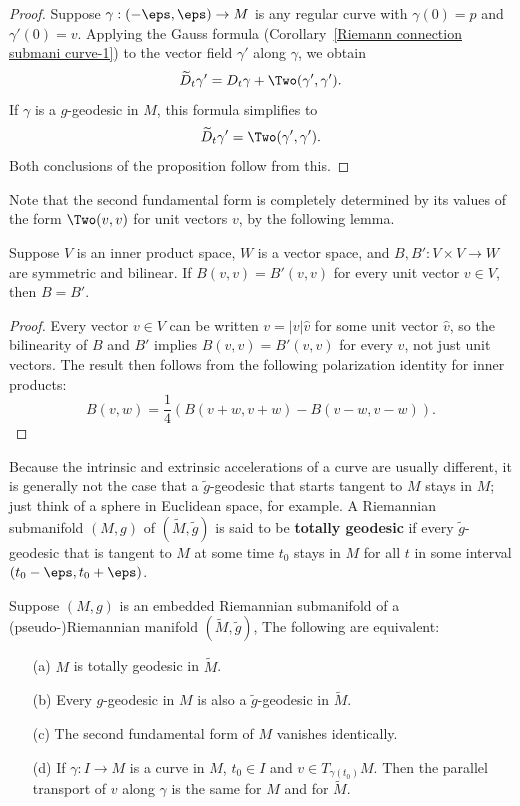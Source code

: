 \begin{proof}
Suppose $\gamma:(-\eps,\eps)\to M$ is any regular curve with $\gamma(0)=p$ and $\gamma'(0)=v$. Applying the Gauss formula (Corollary~\ref{Riemann connection submani curve-1}) 
to the vector field $\gamma'$ along $\gamma$, we obtain
\[\widetilde{D}_t\gamma'=D_t\gamma+\Two(\gamma',\gamma').\]
If $\gamma$ is a $g$-geodesic in $M$, this formula simplifies to
\[\widetilde{D}_t\gamma'=\Two(\gamma',\gamma').\]
Both conclusions of the proposition follow from this.
\end{proof}
Note that the second fundamental form is completely determined by its values of the form $\Two(v,v)$ for unit vectors $v$, by the following lemma.
\begin{lemma}\label{Bilinear symmetric form lemma}
Suppose $V$ is an inner product space, $W$ is a vector space, and $B,B':V\times V\to W$ are symmetric and bilinear. If $B(v,v)=B'(v,v)$ for every unit vector $v\in V$, 
then $B=B'$.
\end{lemma}
\begin{proof}
Every vector $v\in V$ can be written $v=|v|\hat{v}$ for some unit vector $\hat{v}$, so the bilinearity of $B$ and $B'$ implies $B(v,v)=B'(v,v)$ for every $v$, 
not just unit vectors. The result then follows from the following polarization identity for inner products:
\begin{equation*}
B(v,w)=\frac{1}{4}(B(v+w,v+w)-B(v-w,v-w)).\tag*{\qedhere}
\end{equation*}
\end{proof}
Because the intrinsic and extrinsic accelerations of a curve are usually different, it is generally not the case that a $\tilde{g}$-geodesic that starts tangent to 
$M$ stays in $M$; just think of a sphere in Euclidean space, for example. A Riemannian submanifold $(M,g)$ of $(\widetilde{M},\tilde{g})$ is said to be \textbf{totally 
geodesic} if every $\tilde{g}$-geodesic that is tangent to $M$ at some time $t_0$ stays in $M$ for all $t$ in some interval $(t_0-\eps,t_0+\eps)$.
\begin{proposition}
Suppose $(M,g)$ is an embedded Riemannian submanifold of a (pseudo-)Riemannian manifold $(\widetilde{M},\tilde{g})$, The following are equivalent:
\begin{itemize}
\item[(a)] $M$ is totally geodesic in $\widetilde{M}$. 
\item[(b)] Every $g$-geodesic in $M$ is also a $\tilde{g}$-geodesic in $\widetilde{M}$.
\item[(c)] The second fundamental form of $M$ vanishes identically.
\item[(d)] If $\gamma:I\to M$ is a curve in $M$, $t_0\in I$ and $v\in T_{\gamma(t_0)}M$. Then the parallel transport of $v$ along $\gamma$ is the same for $M$ and 
for $\widetilde{M}$. 
\end{itemize}
\end{proposition}
